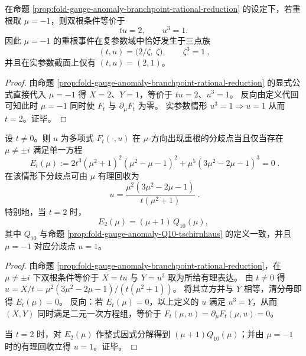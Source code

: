 \begin{corollary}[\texorpdfstring{$\mu=-1$}{mu=-1} 分歧共振的全复域分类与实刚性]\label{cor:fold-gauge-anomaly-mu-minus1-branch-classification}
在命题 \ref{prop:fold-gauge-anomaly-branchpoint-rational-reduction} 的设定下，若重根取 \(\mu=-1\)，则双根条件等价于
\[
tu=2,\qquad u^3=1.
\]
因此 \(\mu=-1\) 的重根事件在复参数域中恰好发生于三点族
\[
\boxed{\ (t,u)=\bigl(2/\zeta,\ \zeta\bigr),\qquad \zeta^3=1\ },
\]
并且在实参数截面上仅有 \((t,u)=(2,1)\)。
\end{corollary}
\begin{proof}
由命题 \ref{prop:fold-gauge-anomaly-branchpoint-rational-reduction} 的显式公式直接代入 \(\mu=-1\) 得 \(X=2\)、\(Y=1\)，等价于 \(tu=2\)、\(u^3=1\)。
反向由定义代回可知此时 \(\mu=-1\) 同时使 \(F_t\) 与 \(\partial_\mu F_t\) 为零。
实参数情形 \(u^3=1\Rightarrow u=1\) 从而 \(t=2\)。证毕。
\end{proof}

\begin{proposition}\label{prop:fold-gauge-anomaly-branchpoint-mu-reduction-Et}
设 \(t\neq 0\)。则 \(u\) 为多项式 \(F_t(\cdot,u)\) 在 \(\mu\)-方向出现重根的分歧点当且仅当存在 \(\mu\neq \pm i\) 满足单一方程
\[
\boxed{\;
E_t(\mu):=
2t^3(\mu^2+1)^2(\mu^2-\mu-1)^2+\mu^5(3\mu^2-2\mu-1)^3=0\; }.
\]
在该情形下分歧点可由 \(\mu\) 有理回收为
\[
\boxed{\;
u=\frac{\mu^2(3\mu^2-2\mu-1)}{t(\mu^2+1)}\; }.
\]
特别地，当 \(t=2\) 时，
\[
E_2(\mu)=(\mu+1)\,Q_{10}(\mu),
\]
其中 \(Q_{10}\) 与命题 \ref{prop:fold-gauge-anomaly-Q10-tschirnhaus} 的定义一致，并且 \(\mu=-1\) 对应分歧点 \(u=1\)。
\end{proposition}
\begin{proof}
由命题 \ref{prop:fold-gauge-anomaly-branchpoint-rational-reduction}，在 \(\mu\neq \pm i\) 下双根条件等价于 \(X=tu\) 与 \(Y=u^3\) 取为所给有理表达。
由 \(t\neq 0\) 得
\(
u=X/t=\mu^2(3\mu^2-2\mu-1)/(t(\mu^2+1))
\)。
将其立方并与 \(Y\) 相等，清分母即得 \(E_t(\mu)=0\)。
反向：若 \(E_t(\mu)=0\)，以上定义的 \(u\) 满足 \(u^3=Y\)，从而 \((X,Y)\) 同时满足二元一次方程组，等价于 \(F_t(\mu,u)=\partial_\mu F_t(\mu,u)=0\)。
\par
当 \(t=2\) 时，对 \(E_2(\mu)\) 作整式因式分解得到 \((\mu+1)Q_{10}(\mu)\)；并由 \(\mu=-1\) 时的有理回收立得 \(u=1\)。证毕。
\end{proof}

